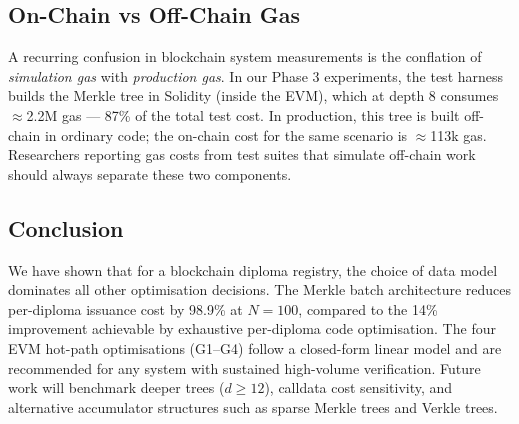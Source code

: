 \documentclass[conference]{IEEEtran}
\begin{document}
\subsection{On-Chain vs Off-Chain Gas}

A recurring confusion in blockchain system measurements is the
conflation of \emph{simulation gas} with \emph{production gas}.
In our Phase 3 experiments, the test harness builds the Merkle tree
in Solidity (inside the EVM), which at depth 8 consumes
$\approx$2.2M gas — 87\% of the total test cost.
In production, this tree is built off-chain in ordinary code;
the on-chain cost for the same scenario is $\approx$113k gas.
Researchers reporting gas costs from test suites that simulate
off-chain work should always separate these two components.

\subsection{Conclusion}

We have shown that for a blockchain diploma registry,
the choice of data model dominates all other optimisation decisions.
The Merkle batch architecture reduces per-diploma issuance cost
by 98.9\% at $N=100$, compared to the 14\% improvement
achievable by exhaustive per-diploma code optimisation.
The four EVM hot-path optimisations (G1–G4) follow a closed-form
linear model and are recommended for any system with
sustained high-volume verification.
Future work will benchmark deeper trees ($d\geq12$),
calldata cost sensitivity, and alternative accumulator structures
such as sparse Merkle trees and Verkle trees.
\end{document}
